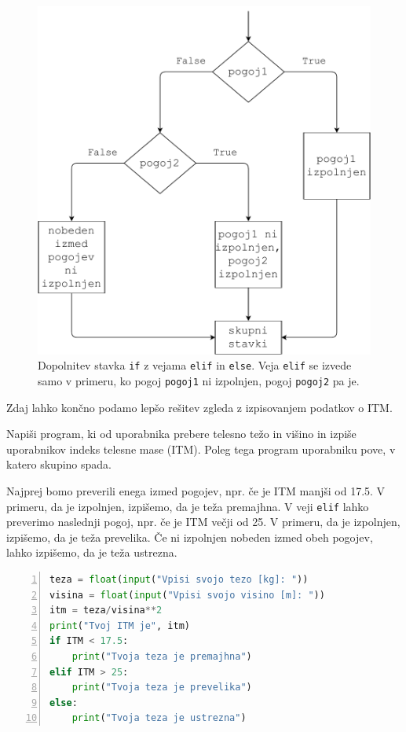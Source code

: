 \begin{figure}
    \centering
    \includegraphics[width=0.65\linewidth]{img/if3.pdf}
    \caption{Dopolnitev stavka \texttt{if} z vejama \texttt{elif} in \texttt{else}. Veja \texttt{elif} se izvede samo v primeru, ko pogoj \texttt{pogoj1} ni izpolnjen, pogoj \texttt{pogoj2} pa je.}
    \label{img:if3}
\end{figure}

Zdaj lahko končno podamo lepšo rešitev zgleda z izpisovanjem podatkov o ITM.
\begin{zgled}
Napiši program, ki od uporabnika prebere telesno težo in višino in izpiše uporabnikov indeks telesne mase (ITM). Poleg tega program uporabniku pove, v katero skupino spada. 
\end{zgled}
\begin{resitev}
Najprej bomo preverili enega izmed pogojev, npr. če je ITM manjši od 17.5. V primeru, da je izpolnjen, izpišemo, da je teža premajhna. V veji \texttt{elif} lahko preverimo naslednji pogoj, npr. če je ITM večji od 25. V primeru, da je izpolnjen, izpišemo, da je teža prevelika. Če ni izpolnjen nobeden izmed obeh pogojev, lahko izpišemo, da je teža ustrezna.
\begin{lstlisting}[language=Python,numbers=left]
teza = float(input("Vpisi svojo tezo [kg]: "))
visina = float(input("Vpisi svojo visino [m]: "))
itm = teza/visina**2
print("Tvoj ITM je", itm)
if ITM < 17.5:
    print("Tvoja teza je premajhna")
elif ITM > 25:
    print("Tvoja teza je prevelika")
else:
    print("Tvoja teza je ustrezna")
\end{lstlisting}
\end{resitev}

